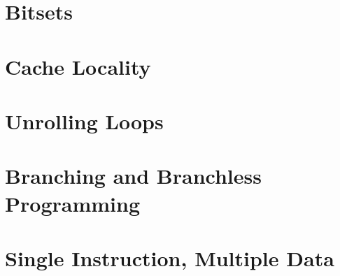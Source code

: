 \documentclass{beamer}
\begin{document}
\section*{Bitsets}

\section*{Cache Locality}

\section*{Unrolling Loops}

\section*{Branching and Branchless Programming}

\section*{Single Instruction, Multiple Data}
\end{document}
